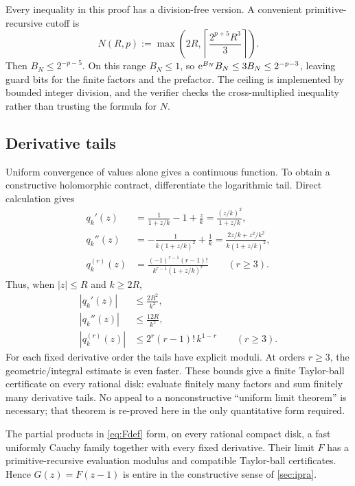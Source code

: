 Every inequality in this proof has a division-free version.  A convenient
primitive-recursive cutoff is
\begin{equation}\label{eq:product-cutoff}
 N(R,p):=\max\!\left(2R,\left\lceil\frac{2^{p+5}R^3}{3}\right\rceil\right).
\end{equation}
Then \(B_N\le2^{-p-5}\).  On this range \(B_N\le1\), so
\(\mathrm e^{B_N}B_N\le3B_N\le2^{-p-3}\), leaving guard bits for the
finite factors and the prefactor.  The ceiling is implemented by bounded
integer division, and the verifier checks the cross-multiplied inequality
rather than trusting the formula for \(N\).

\subsection{Derivative tails}

Uniform convergence of values alone gives a continuous function.  To obtain a
constructive holomorphic contract, differentiate the logarithmic tail.  Direct
calculation gives
\begin{align}
 q_k'(z)&=\frac1{1+z/k}-1+\frac zk
        =\frac{(z/k)^2}{1+z/k},\label{eq:qprime}\\
 q_k''(z)&=-\frac{1}{k(1+z/k)^2}+\frac1k
        =\frac{2z/k+z^2/k^2}{k(1+z/k)^2},\label{eq:qsecond}\\
 q_k^{(r)}(z)&=\frac{(-1)^{r-1}(r-1)!}
 {k^{r-1}(1+z/k)^r}\qquad(r\ge3).
 \label{eq:qhigher}
\end{align}
Thus, when \(|z|\le R\) and \(k\ge2R\),
\begin{align}
 |q_k'(z)|&\le \frac{2R^2}{k^2},\label{eq:qprime-bound}\\
 |q_k''(z)|&\le \frac{12R}{k^2},\label{eq:qsecond-bound}\\
 |q_k^{(r)}(z)|&\le
 2^r(r-1)!\,k^{1-r}\qquad(r\ge3).
 \label{eq:qhigher-bound}
\end{align}
For each fixed derivative order the tails have explicit moduli.  At orders
\(r\ge3\), the geometric/integral estimate is even faster.  These bounds give
a finite Taylor-ball certificate on every rational disk: evaluate finitely many
factors and sum finitely many derivative tails.  No appeal to a nonconstructive
``uniform limit theorem'' is necessary; that theorem is re-proved here in the
only quantitative form required.

\begin{theorem}\label{thm:entire}
The partial products in \cref{eq:Fdef} form, on every rational compact disk, a
fast uniformly Cauchy family together with every fixed derivative.  Their limit
\(F\) has a primitive-recursive evaluation modulus and compatible Taylor-ball
certificates.  Hence \(G(z)=F(z-1)\) is entire in the constructive sense of
\cref{sec:ipra}.
\end{theorem}

